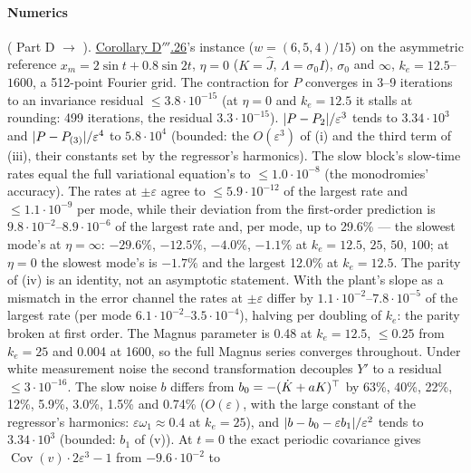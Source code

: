 \begin{sloppypar}
\paragraph{Numerics} ( Part D $\to$ ).
\hyperref[res:thmDppp:26]{Corollary D$'''$.26}'s instance ($w = (6,5,4)/15$) on the asymmetric reference
$x_m = 2\sin t + 0.8\sin2t$, $\eta = 0$ ($K = \hat J$, $\Lambda = \sigma_0I$), $\sigma_0$ and $\infty$,
$k_e = 12.5$--$1600$, a 512-point Fourier grid. The contraction for $P$ converges in 3--9 iterations to an invariance
residual $\le3.8\cdot10^{-15}$ (at $\eta = 0$ and $k_e = 12.5$ it stalls at rounding: 499 iterations, the residual
$3.3\cdot10^{-15}$). $\lvert P - P_2\rvert/\varepsilon^3$ tends to $3.34\cdot10^3$ and $\lvert P - P_{(3)}\rvert/\varepsilon^4$ to
$5.8\cdot10^4$ (bounded: the $O(\varepsilon^3)$ of (i) and the third term of (iii), their constants set by the
regressor's harmonics). The slow block's slow-time rates equal the full variational equation's to
$\le1.0\cdot10^{-8}$ (the monodromies' accuracy). The rates at $\pm\varepsilon$ agree to $\le5.9\cdot10^{-12}$ of the
largest rate and $\le1.1\cdot10^{-9}$ per mode, while their deviation from the first-order prediction is
$9.8\cdot10^{-2}$--$8.9\cdot10^{-6}$ of the largest rate and, per mode, up to 29.6\% --- the slowest mode's at
$\eta = \infty$: $-29.6\%$, $-12.5\%$, $-4.0\%$, $-1.1\%$ at $k_e = 12.5$, $25$, $50$, $100$; at $\eta = 0$ the
slowest mode's is $-1.7\%$ and the largest 12.0\% at $k_e = 12.5$. The parity of (iv) is an identity, not an
asymptotic statement. With the plant's slope as a mismatch in the error channel the rates at $\pm\varepsilon$ differ
by $1.1\cdot10^{-2}$--$7.8\cdot10^{-5}$ of the largest rate (per mode $6.1\cdot10^{-2}$--$3.5\cdot10^{-4}$), halving
per doubling of $k_e$: the parity broken at first order. The Magnus parameter is 0.48 at $k_e = 12.5$, $\le0.25$ from
$k_e = 25$ and 0.004 at 1600, so the full Magnus series converges throughout. Under white measurement noise the second
transformation decouples $Y'$ to a residual $\le3\cdot10^{-16}$. The slow noise $b$ differs from
$b_0 = -(\dot K + aK)^\top$ by 63\%, 40\%, 22\%, 12\%, 5.9\%, 3.0\%, 1.5\% and 0.74\% ($O(\varepsilon)$, with the large
constant of the regressor's harmonics: $\varepsilon\omega_1\approx0.4$ at $k_e = 25$), and
$\lvert b - b_0 - \varepsilon b_1\rvert/\varepsilon^2$ tends to $3.34\cdot10^3$ (bounded: $b_1$ of (v)). At $t = 0$ the exact
periodic covariance gives $\operatorname{Cov}(v)\cdot2\varepsilon^3 - 1$ from $-9.6\cdot10^{-2}$ to

\end{sloppypar}
